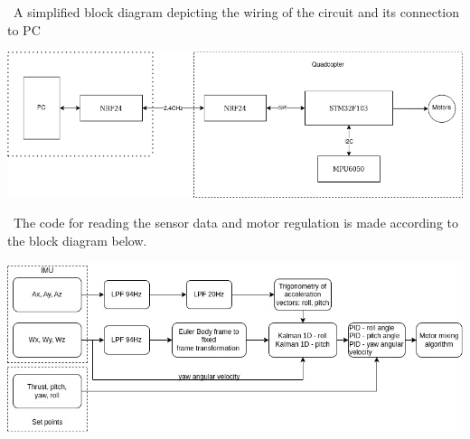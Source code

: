 \section{}

\ 
{A simplified block diagram depicting the wiring of the circuit and its connection to PC}

\begin{center}
    \includegraphics[width=\columnwidth]{img/diagram.png}
\end{center}

\
{The code for reading the sensor data and motor regulation is made according to the block diagram below.}
\begin{center}
 \includegraphics[width=\columnwidth]{img/dsp.jpg}
\end{center}

